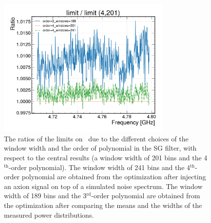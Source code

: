 \begin{figure} [htbp]
  \centering
  \includegraphics[width=8.6cm]{figures/sys_compareSG_4_201.png}
  \caption{The ratios of the limits on \gagg\ due to the different choices 
 of the window width and the order of polynomial in the SG filter, with 
respect to 
 the central results (a window width of 201 bins and the 4$^\text{th}$-order 
 polynomial). The window width of 241 bins and the 4$^\text{th}$-order 
 polynomial are obtained from the optimization after injecting an axion 
signal on top of a simulated noise spectrum. The window width of 189 bins and 
the 3$^\text{rd}$-order polynomial are obtained from the optimization 
 after comparing the means and the widths of the measured power distributions.}
  \label{fig:syssgfilter}
\end{figure}
 

